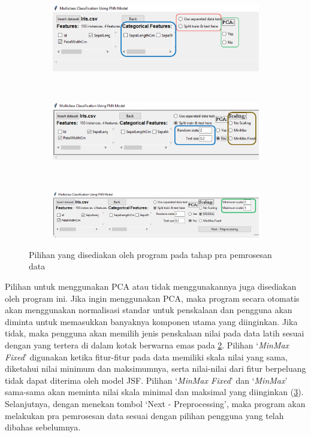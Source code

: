 \begin{figure}[h!]
\begin{subfigure}[h]{\textwidth}
  \centering
  \includegraphics[width=.98\linewidth]{SSprogram/03.png}  
  \caption{}
  \label{fig: ss 03}
\end{subfigure}
\\
\begin{subfigure}[h]{\textwidth}
  \centering
  \includegraphics[width=.98\linewidth]{SSprogram/04.png}
  \caption{}
  \label{fig: ss 04}
\end{subfigure}%
\\
\begin{subfigure}[h]{\textwidth}
  \centering
  \includegraphics[width=.98\linewidth]{SSprogram/05.png}  
  \caption{}
  \label{fig: ss 05}
\end{subfigure}
\caption{Pilihan yang disediakan oleh program pada tahap pra pemrosesan data}
\label{fig: pra pemrosesan}
\end{figure}

\noindent Pilihan untuk menggunakan PCA atau tidak menggunakannya juga disediakan oleh program ini. Jika ingin menggunakan PCA, maka program secara otomatis akan menggunakan normalisasi standar untuk penskalaan dan pengguna akan diminta untuk memasukkan banyaknya komponen utama yang diinginkan. Jika tidak, maka pengguna akan memilih jenis penskalaan nilai pada data latih sesuai dengan yang tertera di dalam kotak berwarna emas pada \ref{fig: ss 04}. Pilihan `\emph{MinMax Fixed}' digunakan ketika fitur-fitur pada data memiliki skala nilai yang sama, diketahui nilai minimum dan maksimumnya, serta nilai-nilai dari fitur berpeluang tidak dapat diterima oleh model JSF. Pilihan `\emph{MinMax Fixed}' dan `\emph{MinMax}' sama-sama akan meminta nilai skala minimal dan maksimal yang diinginkan (\ref{fig: ss 05}). Selanjutnya, dengan menekan tombol `\colorbox{gray!30}{Next - Preprocessing}', maka program akan melakukan pra pemrosesan data sesuai dengan pilihan pengguna yang telah dibahas sebelumnya.

